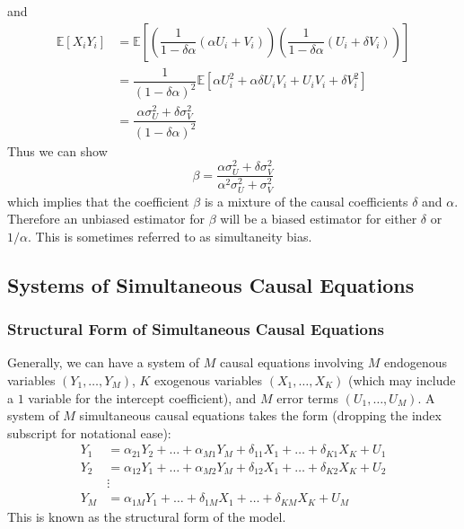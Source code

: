 \documentclass[11pt]{report} %
\begin{document}
and
\begin{align}
\mathbb{E}\left[X_{i}Y_{i}\right] &= \mathbb{E}\left[\left(\dfrac{1}{1 - \delta\alpha}\left(\alpha U_{i} + V_{i}\right)\right)\left(\dfrac{1}{1 - \delta\alpha}\left(U_{i} + \delta V_{i}\right)\right)\right] \\
&= \dfrac{1}{\left(1 - \delta\alpha\right)^{2}}\mathbb{E}\left[\alpha U_{i}^{2} + \alpha\delta U_{i}V_{i} + U_{i}V_{i} + \delta V_{i}^{2}\right] \\
&= \dfrac{\alpha\sigma_{U}^{2} + \delta\sigma_{V}^{2}}{\left(1 - \delta\alpha\right)^{2}}
\end{align}
Thus we can show
\begin{equation}
\beta = \dfrac{\alpha\sigma_{U}^{2} + \delta\sigma_{V}^{2}}{\alpha^{2}\sigma_{U}^{2} + \sigma_{V}^{2}}
\end{equation}
which implies that the coefficient $\beta$ is a mixture of the causal coefficients $\delta$ and $\alpha$. Therefore an unbiased estimator for $\beta$ will be a biased estimator for either $\delta$ or $1/\alpha$. This is sometimes referred to as simultaneity bias.

\subsection{Systems of Simultaneous Causal Equations \cite{Greene2012}}

\subsubsection{Structural Form of Simultaneous Causal Equations}

Generally, we can have a system of $M$ causal equations involving $M$ endogenous variables $\left(Y_{1}, \dots, Y_{M}\right)$, $K$ exogenous variables $\left(X_{1}, \dots, X_{K}\right)$ (which may include a $1$ variable for the intercept coefficient), and $M$ error terms $\left(U_{1}, \dots, U_{M}\right)$.  A system of $M$ simultaneous causal equations takes the form (dropping the index subscript for notational ease):
\begin{align}
Y_{1} &= \alpha_{21}Y_{2} + \dots + \alpha_{M1}Y_{M} + \delta_{11}X_{1} + \dots + \delta_{K1}X_{K} + U_{1} \\
Y_{2} &= \alpha_{12}Y_{1} + \dots + \alpha_{M2}Y_{M} + \delta_{12}X_{1} + \dots + \delta_{K2}X_{K} + U_{2} \\
&\vdots \\
Y_{M} &= \alpha_{1M}Y_{1} + \dots  + \delta_{1M}X_{1} + \dots + \delta_{KM}X_{K} + U_{M}
\end{align}
This is known as the structural form of the model. 
\end{document}
